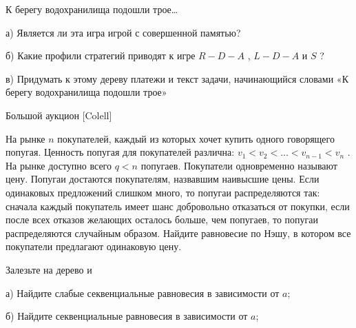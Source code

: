 \begin{problem}
 К берегу водохранилища подошли трое\ldots \par
{}
а) Является ли эта игра игрой с совершенной памятью?\par
б) Какие профили стратегий приводят к игре  $R-D-A$ ,  $L-D-A$  и  $S$ ?\par
в) Придумать к этому дереву платежи и текст задачи, начинающийся словами «К берегу водохранилища подошли трое»



\begin{sol}

\end{sol}
\end{problem}



\begin{problem}
 Большой аукцион [Colell]\par
На рынке  $n$  покупателей, каждый из которых хочет купить одного говорящего попугая. Ценность попугая для покупателей различна:  $v_{1} <v_{2} <\ldots <v_{n-1} <v_{n} $ . На рынке доступно всего  $q<n$  попугаев. Покупатели одновременно называют цену. Попугаи достаются покупателям, назвавшим наивысшие цены. Если одинаковых предложений слишком много, то попугаи распределяются так: сначала каждый покупатель имеет шанс добровольно отказаться от покупки, если после всех отказов желающих осталось больше, чем попугаев, то попугаи распределяются случайным образом.
Найдите равновесие по Нэшу, в котором все покупатели предлагают одинаковую цену.\par



\begin{sol}

\end{sol}
\end{problem}



\begin{problem}
 Залезьте на дерево и


а) Найдите слабые секвенциальные равновесия в зависимости от  $a$;\par
б) Найдите секвенциальные равновесия в зависимости от  $a$;



\begin{sol}

\end{sol}
\end{problem}



